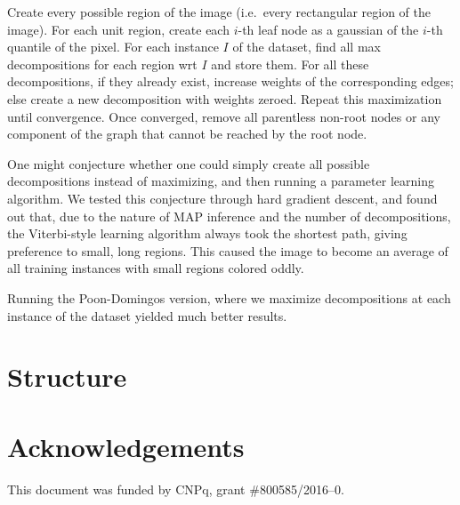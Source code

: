 \documentclass{amsart}
\theoremstyle{plain}
\numberwithin{equation}{section}
\begin{document}
Create every possible region of the image (i.e.\ every rectangular region of the image). For each
unit region, create each $i$-th leaf node as a gaussian of the $i$-th quantile of the pixel. For
each instance $I$ of the dataset, find all max decompositions for each region wrt $I$ and store
them. For all these decompositions, if they already exist, increase weights of the corresponding
edges; else create a new decomposition with weights zeroed. Repeat this maximization until
convergence. Once converged, remove all parentless non-root nodes or any component of the graph
that cannot be reached by the root node.

One might conjecture whether one could simply create all possible decompositions instead of
maximizing, and then running a parameter learning algorithm. We tested this conjecture through hard
gradient descent, and found out that, due to the nature of MAP inference and the number of
decompositions, the Viterbi-style learning algorithm always took the shortest path, giving
preference to small, long regions. This caused the image to become an average of all training
instances with small regions colored oddly.

Running the Poon-Domingos version, where we maximize decompositions at each instance of the dataset
yielded much better results.

\section{Structure}


\section{Acknowledgements}

This document was funded by CNPq, grant \#800585/2016--0.


\printbibliography[]
\end{document}
